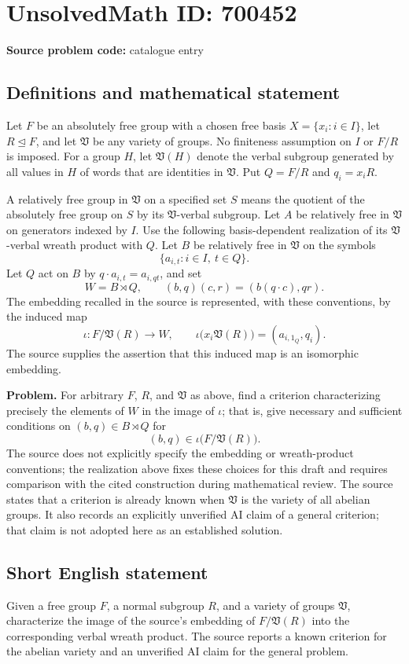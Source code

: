 \documentclass[11pt]{article}
\begin{document}
\section*{UnsolvedMath ID: 700452}
\textbf{Source problem code:} catalogue entry
\subsection{Definitions and mathematical statement}
Let \(F\) be an absolutely free group with a chosen free basis \(X=\{x_i:i\in I\}\), let \(R\trianglelefteq F\), and let \(\mathfrak V\) be any variety of groups. No finiteness assumption on \(I\) or \(F/R\) is imposed. For a group \(H\), let \(\mathfrak V(H)\) denote the verbal subgroup generated by all values in \(H\) of words that are identities in \(\mathfrak V\). Put \(Q=F/R\) and \(q_i=x_iR\).

A relatively free group in \(\mathfrak V\) on a specified set \(S\) means the quotient of the absolutely free group on \(S\) by its \(\mathfrak V\)-verbal subgroup. Let \(A\) be relatively free in \(\mathfrak V\) on generators indexed by \(I\). Use the following basis-dependent realization of its \(\mathfrak V\)-verbal wreath product with \(Q\). Let \(B\) be relatively free in \(\mathfrak V\) on the symbols
\[
\{a_{i,t}:i\in I,\ t\in Q\}.
\]
Let \(Q\) act on \(B\) by \(q\cdot a_{i,t}=a_{i,qt}\), and set
\[
W=B\rtimes Q,\qquad (b,q)(c,r)=(b(q\cdot c),qr).
\]
The embedding recalled in the source is represented, with these conventions, by the induced map
\[
\iota:F/\mathfrak V(R)\longrightarrow W,
\qquad
\iota\bigl(x_i\mathfrak V(R)\bigr)=(a_{i,1_Q},q_i).
\]
The source supplies the assertion that this induced map is an isomorphic embedding.

\textbf{Problem.} For arbitrary \(F\), \(R\), and \(\mathfrak V\) as above, find a criterion characterizing precisely the elements of \(W\) in the image of \(\iota\); that is, give necessary and sufficient conditions on \((b,q)\in B\rtimes Q\) for
\[
(b,q)\in\iota\bigl(F/\mathfrak V(R)\bigr).
\]
The source does not explicitly specify the embedding or wreath-product conventions; the realization above fixes these choices for this draft and requires comparison with the cited construction during mathematical review. The source states that a criterion is already known when \(\mathfrak V\) is the variety of all abelian groups. It also records an explicitly unverified AI claim of a general criterion; that claim is not adopted here as an established solution.
\subsection{Short English statement}
Given a free group \(F\), a normal subgroup \(R\), and a variety of groups \(\mathfrak V\), characterize the image of the source's embedding of \(F/\mathfrak V(R)\) into the corresponding verbal wreath product. The source reports a known criterion for the abelian variety and an unverified AI claim for the general problem.
\end{document}
